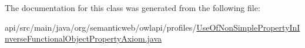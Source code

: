 The documentation for this class was generated from the following file\-:\begin{DoxyCompactItemize}
\item 
api/src/main/java/org/semanticweb/owlapi/profiles/\hyperlink{_use_of_non_simple_property_in_inverse_functional_object_property_axiom_8java}{Use\-Of\-Non\-Simple\-Property\-In\-Inverse\-Functional\-Object\-Property\-Axiom.\-java}\end{DoxyCompactItemize}

